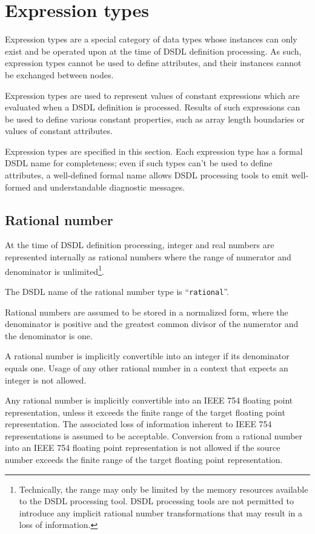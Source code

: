 
\section{Expression types}\label{sec:dsdl_expression_types}

Expression types are a special category of data types whose instances can only exist and be operated upon
at the time of DSDL definition processing.
As such, expression types cannot be used to define attributes,
and their instances cannot be exchanged between nodes.

Expression types are used to represent values of constant expressions which are evaluated
when a DSDL definition is processed.
Results of such expressions can be used to define various constant properties,
such as array length boundaries or values of constant attributes.

Expression types are specified in this section.
Each expression type has a formal DSDL name for completeness;
even if such types can't be used to define attributes,
a well-defined formal name allows DSDL processing tools to emit well-formed
and understandable diagnostic messages.

\subsection{Rational number}\label{sec:dsdl_rational}

At the time of DSDL definition processing, integer and real numbers are represented internally as rational numbers
where the range of numerator and denominator is unlimited\footnote{%
Technically, the range may only be limited by the memory resources available to the DSDL processing tool.
DSDL processing tools are not permitted to introduce any implicit rational number transformations that
may result in a loss of information.}.

The DSDL name of the rational number type is ``\verb|rational|''.

Rational numbers are assumed to be stored in a normalized form, where the denominator is positive
and the greatest common divisor of the numerator and the denominator is one.

A rational number is implicitly convertible into an integer if its denominator equals one.
Usage of any other rational number in a context that expects an integer is not allowed.

Any rational number is implicitly convertible into an IEEE 754 floating point representation,
unless it exceeds the finite range of the target floating point representation.
The associated loss of information inherent to IEEE 754 representations is assumed to be acceptable.
Conversion from a rational number into an IEEE 754 floating point representation
is not allowed if the source number exceeds the finite range of the target floating point representation.

